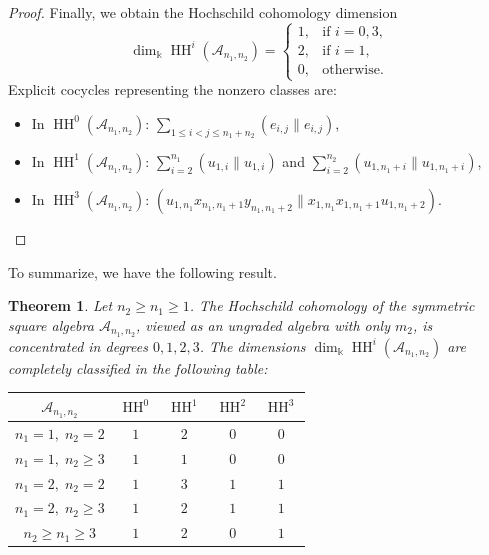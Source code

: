 \documentclass[a4paper, reqno, 11pt]{amsart}
\newtheorem{theorem}{Theorem}[section]
\theoremstyle{definition}
\begin{document}
\begin{proof}
	Finally, we obtain the Hochschild cohomology dimension
	\[
	\dim_{\Bbbk}\operatorname{HH}^i(\mathcal{A}_{n_1,n_2}) = \begin{cases}
		1, & \text{if $i=0,3,$}\\
		2, & \text{if $i=1,$}\\
		0, & \text{otherwise.}
	\end{cases}
	\]
	Explicit cocycles representing the nonzero classes are:
	\begin{itemize}[leftmargin=*, label=--]
		\item In $\operatorname{HH}^0(\mathcal{A}_{n_1, n_2})$: $\sum\limits_{1\le i<j\le n_1+n_2} (e_{i,j} \parallel e_{i,j})$,
		\item In $\operatorname{HH}^1(\mathcal{A}_{n_1, n_2})$: $\sum\limits_{i=2}^{n_1}(u_{1,i} \parallel u_{1, i})$ and $\sum\limits_{i=2}^{n_2}(u_{1,n_1+i} \parallel u_{1,n_1+i})$,
		\item In $\operatorname{HH}^3(\mathcal{A}_{n_1, n_2})$: $(u_{1,n_1}x_{n_1,n_1+1}y_{n_1,n_1+2} \parallel x_{1,n_1}x_{1,n_1+1}u_{1,n_1+2})$.
	\end{itemize}
\end{proof}



To summarize, we have the following result. 
\begin{theorem}\label{thm: main HH result}
	Let $n_2 \geq n_1 \geq 1$. The Hochschild cohomology of the symmetric square algebra \(\mathcal A_{n_1,n_2}\), viewed as an ungraded algebra with only \(m_2\), is concentrated in degrees \(0,1,2,3\). The dimensions $\dim_{\Bbbk} \operatorname{HH}^i(\mathcal{A}_{n_1,n_2})$  are completely classified in the following table:
	\begin{center}
		\renewcommand{\arraystretch}{1.3}
		\begin{tabular}{c|cccc}
			\hline
			$\mathcal{A}_{n_1,n_2}$ & $\operatorname{HH}^0$ & $\operatorname{HH}^1$ & $\operatorname{HH}^2$ & $\operatorname{HH}^3$ \\
			\hline
			$n_1=1,\; n_2=2$ & $1$ & $2$ & $0$ & $0$ \\
			$n_1=1,\; n_2\ge 3$ & $1$ & $1$ & $0$ & $0$ \\
			$n_1=2,\; n_2=2$ & $1$ & $3$ & $1$ & $1$ \\
			$n_1=2,\; n_2\ge 3$ & $1$ & $2$ & $1$ & $1$ \\
			$n_2\ge n_1 \ge 3$ & $1$ & $2$ & $0$ & $1$ \\
			\hline
		\end{tabular}
	\end{center}
\end{theorem}
\end{document}
